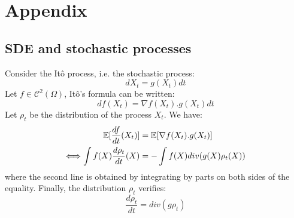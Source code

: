 
\section{Appendix}

\subsection{SDE and stochastic processes}

Consider the Itô process, i.e. the stochastic process:
\begin{equation}
dX_t=g(X_t)dt
\end{equation}
Let $f \in \mathcal{C}^2(\Omega)$, Itô's formula can be written:
\begin{equation*}
df(X_t)=\nabla f(X_t).g(X_t)dt
\end{equation*}
Let $\rho_t$ be the distribution of the process $X_t$. We have:
\begin{align*}
{{\mathbb E}}[\frac{df}{dt}(X_t)]&= {{\mathbb E}}[\nabla f(X_t).g(X_t)]\\
\Longleftrightarrow \int f(X) \frac{d \rho_t}{dt}(X)&=-\int f(X)div(g(X)\rho_t(X))
\end{align*}
where the second line is obtained by integrating by parts on both sides of the equality. Finally, the distribution $\rho_t$ verifies: 
\begin{equation*}
\frac{d\rho_t}{dt}=div(g\rho_t)
\end{equation*}
